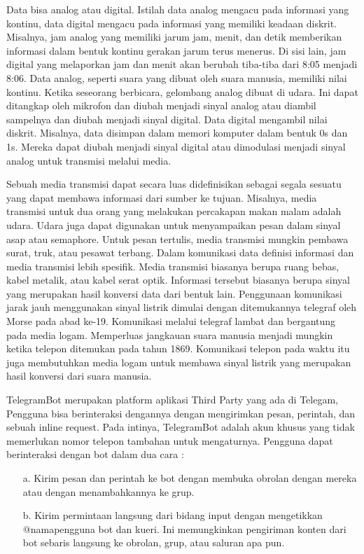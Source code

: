 \documentclass[conference]{IEEEtran}
\begin{document}
Data bisa analog atau digital. Istilah data analog mengacu pada informasi yang kontinu, data digital mengacu pada informasi yang memiliki keadaan diskrit. Misalnya, jam analog yang memiliki jarum jam, menit, dan detik memberikan informasi dalam bentuk kontinu gerakan jarum terus menerus. Di sisi lain, jam digital yang melaporkan jam dan menit akan berubah tiba-tiba dari 8:05 menjadi 8:06. Data analog, seperti suara yang dibuat oleh suara manusia, memiliki nilai kontinu. Ketika seseorang berbicara, gelombang analog dibuat di udara. Ini dapat ditangkap oleh mikrofon dan diubah menjadi sinyal analog atau diambil sampelnya dan diubah menjadi sinyal digital. Data digital mengambil nilai diskrit. Misalnya, data disimpan dalam memori komputer dalam bentuk 0s dan 1s. Mereka dapat diubah menjadi sinyal digital atau dimodulasi menjadi sinyal analog untuk transmisi melalui media.

Sebuah media transmisi dapat secara luas didefinisikan sebagai segala sesuatu yang dapat membawa informasi dari sumber ke tujuan. Misalnya, media transmisi untuk dua orang yang melakukan percakapan makan malam adalah udara. Udara juga dapat digunakan untuk menyampaikan pesan dalam sinyal asap atau semaphore. Untuk pesan tertulis, media transmisi mungkin pembawa surat, truk, atau pesawat terbang. Dalam komunikasi data definisi informasi dan media transmisi lebih spesifik. Media transmisi biasanya berupa ruang bebas, kabel metalik, atau kabel serat optik. Informasi tersebut biasanya berupa sinyal yang merupakan hasil konversi data dari bentuk lain. Penggunaan komunikasi jarak jauh menggunakan sinyal listrik dimulai dengan ditemukannya telegraf oleh Morse pada abad ke-19. Komunikasi melalui telegraf lambat dan bergantung pada media logam. Memperluas jangkauan suara manusia menjadi mungkin ketika telepon ditemukan pada tahun 1869. Komunikasi telepon pada waktu itu juga membutuhkan media logam untuk membawa sinyal listrik yang merupakan hasil konversi dari suara manusia.

TelegramBot merupakan platform aplikasi Third Party yang ada di Telegam, Pengguna bisa berinteraksi dengannya dengan mengirimkan pesan, perintah, dan sebuah inline request. Pada intinya, TelegramBot adalah akun khusus yang tidak memerlukan nomor telepon tambahan untuk mengaturnya. Pengguna dapat berinteraksi dengan bot dalam dua cara :
    \begin{itemize}
        \item[a.] Kirim pesan dan perintah ke bot dengan membuka obrolan dengan mereka atau dengan menambahkannya ke grup.
        \item[b.] Kirim permintaan langsung dari bidang input dengan mengetikkan @namapengguna bot dan kueri. Ini memungkinkan pengiriman konten dari bot sebaris langsung ke obrolan, grup, atau saluran apa pun.
    \end{itemize}
\end{document}
